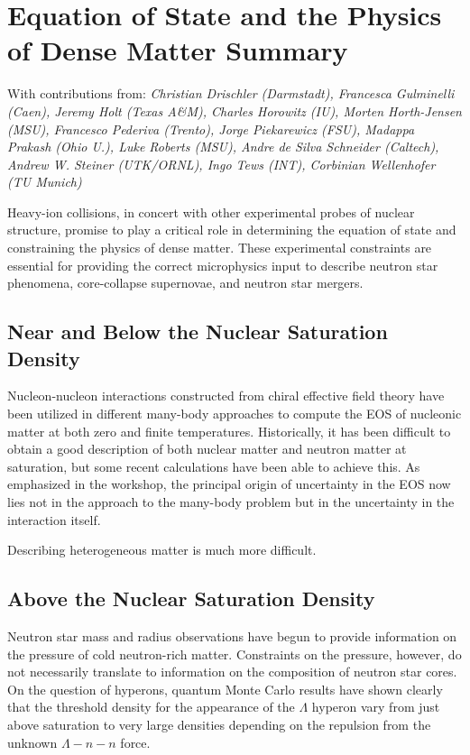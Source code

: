 \documentclass{revtex4}
\begin{document}
\section*{Equation of State and the Physics of Dense Matter Summary}
\begin{center}
  With contributions from: {\it{Christian Drischler (Darmstadt),
      Francesca Gulminelli (Caen),
      Jeremy Holt (Texas A\&M), Charles Horowitz (IU),
      Morten Horth-Jensen (MSU),
      Francesco Pederiva (Trento), Jorge Piekarewicz (FSU),
      Madappa Prakash (Ohio U.), Luke Roberts (MSU),
      Andre de Silva Schneider (Caltech),
      Andrew W. Steiner (UTK/ORNL)}, Ingo Tews (INT),
    Corbinian Wellenhofer (TU Munich)}
\end{center}

Heavy-ion collisions, in concert with other experimental probes of
nuclear structure, promise to play a critical role in determining
the equation of state and constraining the physics of dense matter.
These experimental constraints are essential for providing the correct
microphysics input to describe neutron star phenomena, core-collapse
supernovae, and neutron star mergers.

\subsection{Near and Below the Nuclear Saturation Density}

Nucleon-nucleon interactions constructed from chiral effective field
theory have been utilized in different many-body approaches to compute
the EOS of nucleonic matter at both zero and finite temperatures.
Historically, it has been difficult to obtain a good description of
both nuclear matter and neutron matter at saturation, but some
recent calculations have been able to achieve this. As emphasized
in the workshop, the principal origin of uncertainty in the EOS now
lies not in the approach to the many-body problem but in the
uncertainty in the interaction itself. 

Describing heterogeneous matter is much more difficult.

\subsection{Above the Nuclear Saturation Density}

Neutron star mass and radius observations have begun to provide
information on the pressure of cold neutron-rich matter. Constraints
on the pressure, however, do not necessarily translate to information
on the composition of neutron star cores. On the question of hyperons,
quantum Monte Carlo results have shown clearly that the threshold
density for the appearance of the $\Lambda$ hyperon vary from just
above saturation to very large densities depending on the repulsion
from the unknown $\Lambda-n-n$ force.
\end{document}
